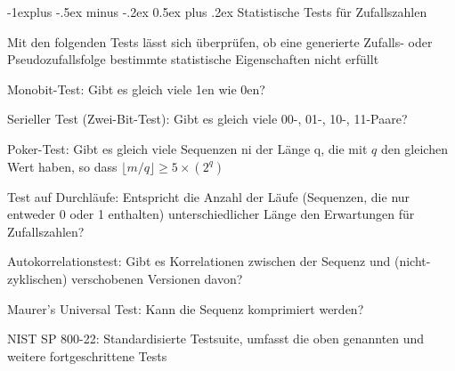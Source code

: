 \documentclass[a4paper]{article}
\makeatletter
\renewcommand{\subsection}{\@startsection{subsection}{2}{0mm}%
 {-1explus -.5ex minus -.2ex}%
 {0.5ex plus .2ex}%
 {\normalfont\normalsize\bfseries}}
\makeatother
\begin{document}
\begin{multicols}{3}
      \subsection{Statistische Tests für Zufallszahlen}
      \begin{itemize*}
            \item Mit den folgenden Tests lässt sich überprüfen, ob eine generierte Zufalls- oder Pseudozufallsfolge bestimmte statistische Eigenschaften nicht erfüllt
            \begin{itemize*}
                  \item Monobit-Test: Gibt es gleich viele 1en wie 0en?
                  \item Serieller Test (Zwei-Bit-Test): Gibt es gleich viele 00-, 01-, 10-, 11-Paare?
                  \item Poker-Test: Gibt es gleich viele Sequenzen ni der Länge q, die mit $q$ den gleichen Wert haben, so dass $\lfloor m/q\rfloor\geq 5\times (2^q)$
                  \item Test auf Durchläufe: Entspricht die Anzahl der Läufe (Sequenzen, die nur entweder 0 oder 1 enthalten) unterschiedlicher Länge den Erwartungen für Zufallszahlen?
                  \item Autokorrelationstest: Gibt es Korrelationen zwischen der Sequenz und (nicht-zyklischen) verschobenen Versionen davon?
                  \item Maurer's Universal Test: Kann die Sequenz komprimiert werden?
                  \item NIST SP 800-22: Standardisierte Testsuite, umfasst die oben genannten und weitere fortgeschrittene Tests
            \end{itemize*}
      \end{itemize*}


\end{multicols}
\end{document}
